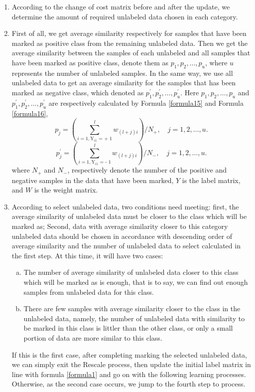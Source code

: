 \documentclass{svjour3}                     %
\begin{document}
\begin{enumerate}[1)]
  \item According to the change of cost matrix before and after the update, we determine the amount of required unlabeled data chosen in each category.
  \item First of all, we get average similarity respectively for samples that have been marked as positive class from the remaining unlabeled data. Then we get the average similarity between the samples of each unlabeled and all samples that have been marked as positive class, denote them as ${p_1},{p_2},\ldots ,{p_u}$, where $u$ represents the number of unlabeled samples. In the same way,  we use all unlabeled data to get an average similarity for the samples that has been marked as negative class, which denoted as $p_1^\prime ,p_2^\prime , \ldots ,p_u^\prime $. Here ${p_1},{p_2},\ldots ,{p_u}$ and $p_1^\prime ,p_2^\prime , \ldots ,p_u^\prime $ are respectively calculated by Formula \ref{formula15} and Formula \ref{formula16},
  \begin{equation} \label{formula15}
    {p_j} = (\mathop \sum \limits_{i = 1,{{\text{Y}}_{i1}}{\text{ =   + }}1}^l {w_{\left( {l + j} \right)i}})/{N_ + },\quad j = 1,2,\ldots,u.
  \end{equation}
  \begin{equation} \label{formula16}
  p_j^\prime  = (\mathop \sum \limits_{i = 1,{{\text{Y}}_{i1}}{\text{ =   - }}1}^l {w_{\left( {l + j} \right)i}})/{N_ - },\quad j = 1,2,\ldots,u.
  \end{equation}
  where $N_+$ and $N_-$, respectively denote the number of the positive and negative samples in the data that have been marked, $Y$ is the label matrix, and $W$ is the weight matrix.
  \item According to select unlabeled data, two conditions need meeting: first, the average similarity
of unlabeled data must be closer to the class which will be marked as; Second, data with average similarity closer to this category unlabeled data should be chosen in accordance with descending order of average similarity and the number of unlabeled data to select calculated in the first step. At this time, it will have two cases:
\begin{enumerate}[a)]
 \item The number of average similarity of unlabeled data closer to this class which will be marked as is enough, that is to say, we can find out enough samples from unlabeled data for this class.
 \item There are few samples with average similarity closer to the class in the unlabeled data, namely, the number of unlabeled data with similarity to be marked in this class is  littler than the other class, or only a small portion of data are more similar to this class.
\end{enumerate}
If this is the first case, after completing marking the selected unlabeled data, we can simply exit the Rescale process, then update the initial label matrix in line with formula \ref{formula1} and go on with the following learning processes. Otherwise, as the second case occurs, we jump to the fourth step to process. \label{step3}


\end{enumerate}
\end{document}
